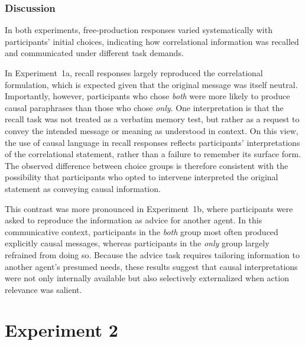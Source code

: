 \documentclass[10pt,letterpaper]{article}
\newcommand{\DL}[1]{\textcolor{red}{[DL: #1]}}
\begin{document}
\subsubsection{Discussion}

In both experiments, free-production responses varied systematically with participants’ initial choices, indicating how correlational information was recalled and communicated under different task demands.

In Experiment~1a, recall responses largely reproduced the correlational formulation, which is expected given that the original message was itself neutral. Importantly, however, participants who chose \emph{both} were more likely to produce causal paraphrases than those who chose \emph{only}. One interpretation is that the recall task was not treated as a verbatim memory test, but rather as a request to convey the intended message or meaning as understood in context. On this view, the use of causal language in recall responses reflects participants’ interpretations of the correlational statement, rather than a failure to remember its surface form. The observed difference between choice groups is therefore consistent with the possibility that participants who opted to intervene interpreted the original statement as conveying causal information.

This contrast was more pronounced in Experiment~1b, where participants were asked to reproduce the information as advice for another agent. In this communicative context, participants in the \emph{both} group most often produced explicitly causal messages, whereas participants in the \emph{only} group largely refrained from doing so. Because the advice task requires tailoring information to another agent’s presumed needs, these results suggest that causal interpretations were not only internally available but also selectively externalized when action relevance was salient.


\section{Experiment 2}
\end{document}
